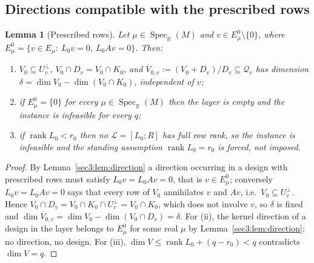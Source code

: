\documentclass[journal]{IEEEtran}
\theoremstyle{plainn}
\newtheorem{lem}[thm]{Lemma}
\theoremstyle{remark}
\newcommand{\rank}{\operatorname{rank}}
\begin{document}
\subsection{Directions compatible with the prescribed rows}
\label{sec3:sub:prescribed}
\begin{lem}[Prescribed rows]
\label{sec3:def:E0}
\label{sec3:lem:prescribed}
\label{sec3:cor:empty}
\label{sec3:proc}
\label{sec3:prop:rankcheck}
Let $\mu\in\operatorname{Spec}_{\mathbb{R}}(M)$ and $v\in E_\mu^0\setminus\{0\}$, where
$E_\mu^0=\{v\in E_\mu:\ L_0v=0,\ L_0Av=0\}$. Then:
\begin{enumerate}[label=(\roman*),leftmargin=*,itemsep=1pt,topsep=2pt]
\item $V_0\subseteq U_v^\perp$, $V_0\cap D_v=V_0\cap K_0$, and
$\overline{V}_{0,v}:=(V_0+D_v)/D_v\subseteq\mathcal{Q}_v$ has dimension
$\delta=\dim V_0-\dim(V_0\cap K_0)$, independent of $v$;
\item if $E_\mu^0=\{0\}$ for every $\mu\in\operatorname{Spec}_{\mathbb{R}}(M)$ then the layer is empty
and the instance is infeasible for every $q$;
\item if $\rank L_0<r_0$ then no $\mathcal{L}=[L_0;R]$ has full row rank, so the instance is
infeasible and the standing assumption $\rank L_0=r_0$ is forced, not imposed.
\end{enumerate}
\end{lem}
\begin{proof}
By Lemma~\ref{sec3:lem:direction} a direction occurring in a design with prescribed rows must satisfy
$L_0v=L_0Av=0$, that is $v\in E_\mu^0$; conversely $L_0v=L_0Av=0$ says that every row of $V_0$
annihilates $v$ and $Av$, i.e.\ $V_0\subseteq U_v^\perp$. Hence
$V_0\cap D_v=V_0\cap K_0\cap U_v^\perp=V_0\cap K_0$, which does not involve $v$, so $\delta$ is fixed
and $\dim\overline{V}_{0,v}=\dim V_0-\dim(V_0\cap D_v)=\delta$. For (ii), the kernel direction of a
design in the layer belongs to $E_\mu^0$ for some real $\mu$ by Lemma~\ref{sec3:lem:direction}; no
direction, no design. For (iii), $\dim V\le\rank L_0+(q-r_0)<q$ contradicts $\dim V=q$.
\end{proof}
\end{document}
